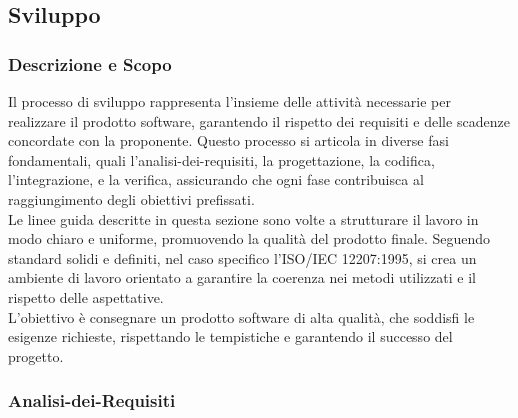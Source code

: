 \documentclass[10pt]{article}
\begin{document}
\begin{justify}
    \subsection{Sviluppo}

    \subsubsection{Descrizione e Scopo}
    Il processo di sviluppo rappresenta l'insieme delle attività necessarie per realizzare il prodotto software, garantendo il rispetto dei requisiti e delle scadenze concordate con la proponente. Questo processo si articola in diverse fasi fondamentali, quali l'analisi-dei-requisiti, la progettazione, la codifica, l'integrazione, e la verifica, assicurando che ogni fase contribuisca al raggiungimento degli obiettivi prefissati.\\
    Le linee guida descritte in questa sezione sono volte a strutturare il lavoro in modo chiaro e uniforme, promuovendo la qualità del prodotto finale. Seguendo standard solidi e definiti, nel caso specifico l'ISO/IEC 12207:1995, si crea un ambiente di lavoro orientato a garantire la coerenza nei metodi utilizzati e il rispetto delle aspettative.\\
    L'obiettivo è consegnare un prodotto software di alta qualità, che soddisfi le esigenze richieste, rispettando le tempistiche e garantendo il successo del progetto.\\

    \subsubsection{Analisi-dei-Requisiti}
    \label{analisi}

\end{justify}
\end{document}
